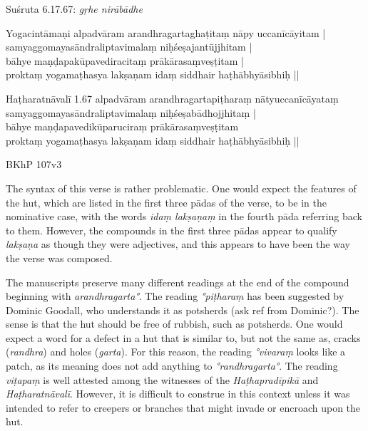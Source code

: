 \begin{ekdosis}
\begin{sources}[hp01_013]
\end{sources}

\begin{testimonia}[hp01_013]
Suśruta 6.17.67:
\emph{gṛhe nirābādhe}

Yogacintāmaṇi
\startverse
alpadvāram arandhragartaghaṭitaṃ nāpy uccanīcāyitam |\\
samyaggomayasāndraliptavimalaṃ niḥśeṣajantūjjhitam |\\
bāhye maṇḍapakūpavediracitaṃ prākārasaṃveṣṭitam |\\
proktaṃ yogamaṭhasya lakṣaṇam idaṃ siddhair haṭhābhyāsibhiḥ ||
\endverse

Haṭharatnāvalī 1.67
\startverse
alpadvāram arandhragartapiṭharaṃ nātyuccanīcāyataṃ\\
samyaggomayasāndraliptavimalaṃ niḥśeṣabādhojjhitaṃ |\\
bāhye maṇḍapavedikūparuciraṃ prākārasaṃveṣṭitam\\
proktaṃ yogamaṭhasya lakṣaṇam idaṃ siddhair haṭhābhyāsibhiḥ ||
\endverse

BKhP 107v3
\end{testimonia}

\begin{philcomm}[hp01_013]  
The syntax of this verse is rather problematic. One would expect the features of the hut, which are listed in the first three pādas of the verse, to be in the nominative case, with the words \emph{idaṃ lakṣaṇaṃ} in the fourth pāda referring back to them. However, the compounds in the first three pādas appear to qualify \emph{lakṣaṇa} as though they were adjectives, and this appears to have been the way the verse was composed.     

The manuscripts preserve many different readings at the end of the compound beginning with \emph{arandhragarta°}. The reading \emph{°piṭharaṃ} has been suggested by Dominic Goodall, who understands it as potsherds (ask ref from Dominic?). The sense is that the hut should be free of rubbish, such as potsherds. One would expect a word for a defect in a hut that is similar to, but not the same as, cracks (\emph{randhra}) and holes (\emph{garta}). For this reason, the reading \emph{°vivaraṃ} looks like a patch, as its meaning does not add anything to \emph{°randhragarta°}. The reading \emph{viṭapaṃ} is well attested among the witnesses of the \emph{Haṭhapradīpikā} and \emph{Haṭharatnāvalī}. However, it is difficult to construe in this context unless it was intended to refer to creepers or branches that might invade or encroach upon the hut.


\end{philcomm}
\end{ekdosis}
